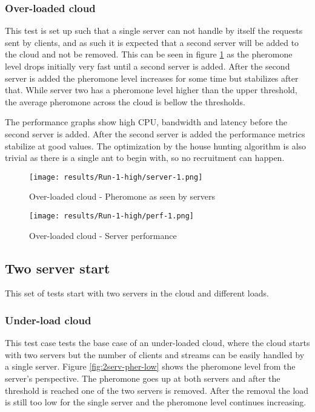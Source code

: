 \subsubsection{Over-loaded cloud}

This test is set up such that a single server can not handle by itself the requests sent by clients, and as such it is expected that a second server will be added to the cloud and not be removed. This can be seen in figure \ref{fig:1serv-pher-high} as the pheromone level drops initially very fast until a second server is added. After the second server is added the pheromone level increases for some time but stabilizes after that. While server two has a pheromone level higher than the upper threshold, the average pheromone across the cloud is bellow the thresholds. 

The performance graphs show high CPU, bandwidth and latency before the second server is added. After the second server is added the performance metrics stabilize at good values. The optimization by the house hunting algorithm is also trivial as there is a single ant to begin with, so no recruitment can happen.

\begin{figure}
	\centering
		\texttt{[image: results/Run-1-high/server-1.png]}
	\caption{Over-loaded cloud - Pheromone as seen by servers}
	\label{fig:1serv-pher-high}
\end{figure}

\begin{figure}
	\centering
		\texttt{[image: results/Run-1-high/perf-1.png]}
	\caption{Over-loaded cloud - Server performance}
	\label{fig:1serv-perf-high}
\end{figure}

\subsection{Two server start}

This set of tests start with two servers in the cloud and different loads.

\subsubsection{Under-load cloud}

This test case tests the base case of an under-loaded cloud, where the cloud starts with two servers but the number of clients and streams can be easily handled by a single server. Figure \ref{fig:2serv-pher-low} shows the pheromone level from the server's perspective. The pheromone goes up at both servers and after the threshold is reached one of the two servers is removed. After the removal the load is still too low for the single server and the pheromone level continues increasing. 

